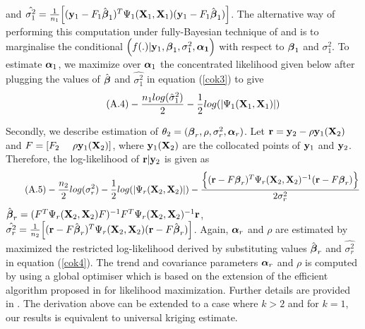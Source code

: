 \begin{acknowledgements}
and $\hat{\sigma_1^2}=\frac{1}{n_1} \Big[({\bf y}_1-F_1{\hat{\boldsymbol{\beta}}}_1)^T  \Psi_1({\bf X}_1,{\bf X}_1)({\bf y}_1-F_1{\hat{\boldsymbol{\beta}}}_1)\Big]$.
The alternative way of performing this computation under fully-Bayesian technique of \citet{co1} and \citet{co2} is to marginalise the conditional $\Big(f(.) | {\bf y}_1, {\boldsymbol{\beta}}_1, \sigma_1^2, \boldsymbol{\alpha_1}\Big)$ with respect to ${\boldsymbol{\beta}}_1$ and $\sigma_1^2$. 
To estimate ${\boldsymbol{\alpha}}_1$, we maximize over ${\boldsymbol{\alpha}}_1$ the concentrated likelihood given below after plugging the values of ${\hat{\boldsymbol{\beta}}}$ and $\hat{\sigma_1^2}$ in equation (\ref{cok3}) to give
\begin{equation}\tag{A.4}
-\frac{n_1 log( \hat \sigma_1^2)}{2} -  \frac{1}{2}log(|\Psi_1({\bf X}_1,{\bf X}_1)|) 
\end{equation}

Secondly, we describe estimation of $\theta_2=({\boldsymbol{\beta}}_r,\rho,\sigma_r^2,{\boldsymbol{\alpha}}_r)$. Let ${\mathbf{r}}={\bf y}_2-\rho {\bf y}_1({\bf X}_2)$ and  $F=[F_2~~~~\rho {\bf y}_1({\bf X}_2)]$,
where ${\bf y}_1({\bf X}_2)$ are the collocated points of ${\bf y}_1$ and ${\bf y}_2$.
 Therefore, the log-likelihood of ${\mathbf{r}}|{\bf y}_2$ is given as
\begin{equation}\tag{A.5}\label{cok4}
-\frac{n_2}{2} log(\sigma_r^2) -  \frac{1}{2}log(|\Psi_r({\bf X}_2,{\bf X}_2)|) - \frac{ \Big \{({\mathbf{r}}-F {\boldsymbol{\beta}}_r)^T \Psi_r({\bf X}_2,{\bf X}_2)^{-1}({\mathbf{r}}-F{\boldsymbol{\beta}}_r)\Big\}}{2\sigma_r^2}
\end{equation}
${\hat{\boldsymbol{\beta}}}_r=(F^T \Psi_r({\bf X}_2,{\bf X}_2) F)^{-1}F^T\Psi_r({\bf X}_2,{\bf X}_2)^{-1}{\mathbf{r}}$, ~~~~~ $\hat{\sigma_r^2}=\frac{1}{n_2} \Big[({\mathbf{r}}-F{\hat{\boldsymbol{\beta}}}_r)^T  \Psi_r({\bf X}_2,{\bf X}_2)({\mathbf{r}}-F{\hat{\boldsymbol{\beta}}}_r)\Big]$. Again, ${\boldsymbol{\alpha}}_r$ and $\rho$ are estimated by maximized the restricted log-likelihood derived by substituting values ${\hat{\boldsymbol{\beta}}}_r$ and $\hat{\sigma_r^2}$ in equation (\ref{cok4}). The trend and covariance parameters ${\boldsymbol{\alpha}}_r$ and $\rho$ is computed by using a global optimiser which is based on the extension of the efficient algorithm proposed in \citet{pd9} for likelihood maximization. Further details are provided in \citep{pd8}. The derivation above can be extended to a case where $k>2$ and for $k=1$, our results is equivalent to universal kriging estimate.  %


\end{acknowledgements}
